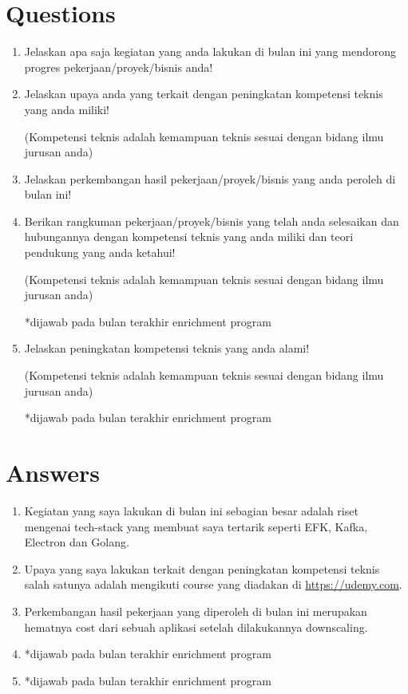 \documentclass[12pt, letterpaper]{article}
\begin{document}
\section*{Questions}
\begin{enumerate}
    \item Jelaskan apa saja kegiatan yang anda lakukan di bulan ini yang mendorong progres pekerjaan/proyek/bisnis anda!
    \item Jelaskan upaya anda yang terkait dengan peningkatan kompetensi teknis yang anda miliki!
    
    (Kompetensi teknis adalah kemampuan teknis sesuai dengan bidang ilmu jurusan anda)
    \item Jelaskan perkembangan hasil pekerjaan/proyek/bisnis yang anda peroleh di bulan ini!
    \item Berikan rangkuman pekerjaan/proyek/bisnis yang telah anda selesaikan dan hubungannya dengan kompetensi teknis yang anda miliki dan teori pendukung yang anda ketahui!
    
    (Kompetensi teknis adalah kemampuan teknis sesuai dengan bidang ilmu jurusan anda)

    *dijawab pada bulan terakhir enrichment program
    \item Jelaskan peningkatan kompetensi teknis yang anda alami!
    
    (Kompetensi teknis adalah kemampuan teknis sesuai dengan bidang ilmu jurusan anda)
    
    *dijawab pada bulan terakhir enrichment program
\end{enumerate}

\section*{Answers}
\begin{enumerate}
    \item Kegiatan yang saya lakukan di bulan ini sebagian besar adalah riset mengenai tech-stack yang membuat saya tertarik seperti EFK, Kafka, Electron dan Golang.
    \item Upaya yang saya lakukan terkait dengan peningkatan kompetensi teknis salah satunya adalah mengikuti course yang diadakan di \url{https://udemy.com}.
    \item Perkembangan hasil pekerjaan yang diperoleh di bulan ini merupakan hematnya cost dari sebuah aplikasi setelah dilakukannya downscaling.
    \item *dijawab pada bulan terakhir enrichment program
    \item *dijawab pada bulan terakhir enrichment program
\end{enumerate}
\end{document}
